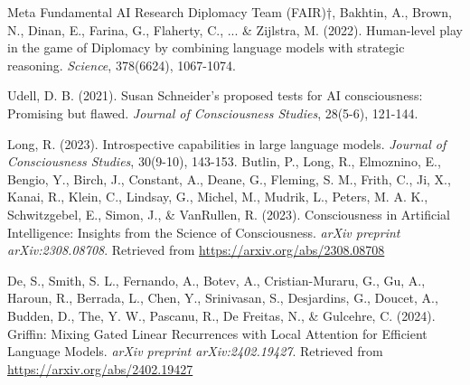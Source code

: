 \documentclass{article}
\begin{document}
\begin{thebibliography}{99}
Meta Fundamental AI Research Diplomacy Team (FAIR)†, Bakhtin, A., Brown, N., Dinan, E., Farina, G., Flaherty, C., ... \& Zijlstra, M. (2022). Human-level play in the game of Diplomacy by combining language models with strategic reasoning. \textit{Science}, 378(6624), 1067-1074.

Udell, D. B. (2021). Susan Schneider's proposed tests for AI consciousness: Promising but flawed. \textit{Journal of Consciousness Studies}, 28(5-6), 121-144.

Long, R. (2023). Introspective capabilities in large language models. \textit{Journal of Consciousness Studies}, 30(9-10), 143-153.
Butlin, P., Long, R., Elmoznino, E., Bengio, Y., Birch, J., Constant, A., Deane, G., Fleming, S. M., Frith, C., Ji, X., Kanai, R., Klein, C., Lindsay, G., Michel, M., Mudrik, L., Peters, M. A. K., Schwitzgebel, E., Simon, J., \& VanRullen, R. (2023). Consciousness in Artificial Intelligence: Insights from the Science of Consciousness. \textit{arXiv preprint arXiv:2308.08708}. Retrieved from \url{https://arxiv.org/abs/2308.08708}

De, S., Smith, S. L., Fernando, A., Botev, A., Cristian-Muraru, G., Gu, A., Haroun, R., Berrada, L., Chen, Y., Srinivasan, S., Desjardins, G., Doucet, A., Budden, D., The, Y. W., Pascanu, R., De Freitas, N., \& Gulcehre, C. (2024). Griffin: Mixing Gated Linear Recurrences with Local Attention for Efficient Language Models. \textit{arXiv preprint arXiv:2402.19427}. Retrieved from \url{https://arxiv.org/abs/2402.19427}

\end{thebibliography}
\end{document}
